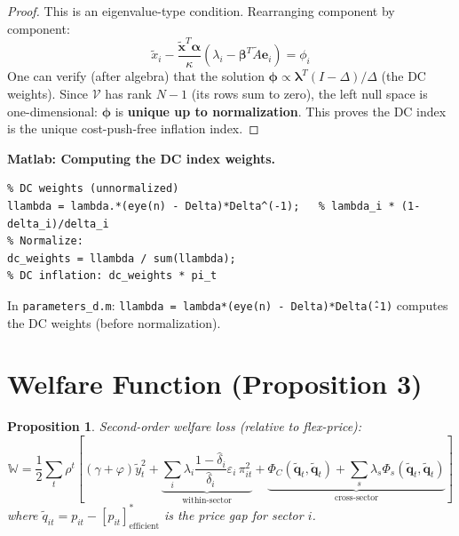 \documentclass[12pt]{article}
\newtheorem{proposition}{Proposition}
\begin{document}
\begin{proof}
This is an eigenvalue-type condition. Rearranging component by component:
\begin{equation}
    \tilde{x}_i - \frac{\tilde{\bm{x}}^T\bm{\alpha}}{\kappa}(\lambda_i - \bm{\beta}^T\tilde{A}\bm{e}_i) = \phi_i
\end{equation}
One can verify (after algebra) that the solution $\bm{\phi} \propto \bm{\lambda}^T(I-\Delta)/\Delta$ (the DC weights). Since $\mathcal{V}$ has rank $N-1$ (its rows sum to zero), the left null space is one-dimensional: $\bm{\phi}$ is \textbf{unique up to normalization}. This proves the DC index is the unique cost-push-free inflation index.

\end{proof}

\begin{codebox}
\textbf{Matlab: Computing the DC index weights.}
\begin{verbatim}
% DC weights (unnormalized)
llambda = lambda.*(eye(n) - Delta)*Delta^(-1);   % lambda_i * (1-delta_i)/delta_i
% Normalize:
dc_weights = llambda / sum(llambda);
% DC inflation: dc_weights * pi_t
\end{verbatim}
In \texttt{parameters\_d.m}: \texttt{llambda = lambda*(eye(n) - Delta)*Delta\^(-1)} computes the DC weights (before normalization).
\end{codebox}

\section{Welfare Function (Proposition 3)}

\begin{proposition}
Second-order welfare loss (relative to flex-price):
\begin{equation}
    \mathbb{W} = \frac{1}{2}\sum_t \rho^t \left[(\gamma+\varphi)\tilde{y}_t^2 + \underbrace{\sum_i \lambda_i \frac{1-\hat{\delta}_i}{\hat{\delta}_i}\varepsilon_i\,\pi_{it}^2}_{\text{within-sector}} + \underbrace{\Phi_C(\tilde{\bm{q}}_t,\tilde{\bm{q}}_t) + \sum_s\lambda_s\Phi_s(\tilde{\bm{q}}_t,\tilde{\bm{q}}_t)}_{\text{cross-sector}}\right]
\end{equation}
where $\tilde{q}_{it} = p_{it} - [p_{it}]^*_{\text{efficient}}$ is the price gap for sector $i$.
\end{proposition}
\end{document}
